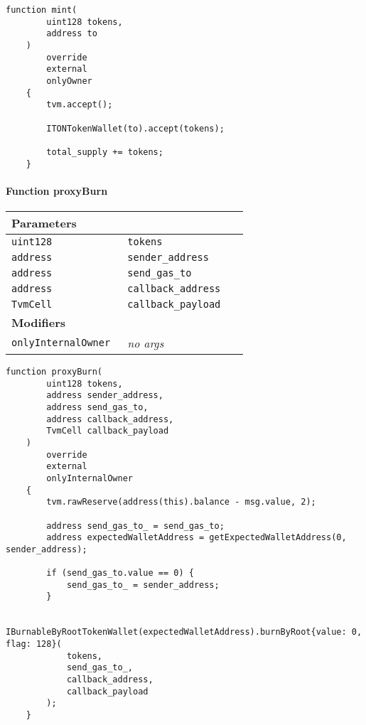 \vspace{2cm}

\begin{lstlisting}[firstnumber=282]
    function mint(
        uint128 tokens,
        address to
    )
        override
        external
        onlyOwner
    {
        tvm.accept();

        ITONTokenWallet(to).accept(tokens);

        total_supply += tokens;
    }
\end{lstlisting}

\paragraph{Function proxyBurn}


\ifsoltables
\noindent\begin{tabular}{|l|l|p{5cm}|}\hline
\multicolumn{3}{|l|}{\bf Parameters}\\\hline
\tt uint128 & \tt tokens &\\\hline
\tt address & \tt sender\_{}address &\\\hline
\tt address & \tt send\_{}gas\_{}to &\\\hline
\tt address & \tt callback\_{}address &\\\hline
\tt TvmCell & \tt callback\_{}payload &\\\hline
\multicolumn{3}{|l|}{\bf Modifiers}\\\hline
\tt onlyInternalOwner & {\em no args} &\\\hline
\end{tabular}
\fi

\vspace{2cm}

\begin{lstlisting}[firstnumber=307]
    function proxyBurn(
        uint128 tokens,
        address sender_address,
        address send_gas_to,
        address callback_address,
        TvmCell callback_payload
    )
        override
        external
        onlyInternalOwner
    {
        tvm.rawReserve(address(this).balance - msg.value, 2);

        address send_gas_to_ = send_gas_to;
        address expectedWalletAddress = getExpectedWalletAddress(0, sender_address);

        if (send_gas_to.value == 0) {
            send_gas_to_ = sender_address;
        }

        IBurnableByRootTokenWallet(expectedWalletAddress).burnByRoot{value: 0, flag: 128}(
            tokens,
            send_gas_to_,
            callback_address,
            callback_payload
        );
    }
\end{lstlisting}

